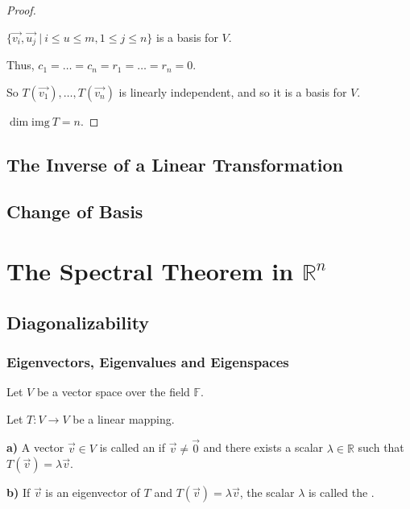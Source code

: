 \documentclass[11pt,fleqn]{book} %
\begin{document}
\begin{proof}
    {~~~}

    $\{\overrightarrow{v_i}, \overrightarrow{u_j} ~|~  i \le u \le m, 1 \le j \le n \}$ is a basis for $V$. 
    
    Thus, $c_1 = \dots = c_n = r_1 = \dots = r_n = 0$. 
    
    So $T(\overrightarrow{v_1}), \dots, T(\overrightarrow{v_n})$ is linearly independent, and so it is a basis for $V$. 
    
    $\dim \mathrm{img}~T = n$. 
\end{proof}

\section{The Inverse of a Linear Transformation}

\section{Change of Basis}

\chapter{The Spectral Theorem in $\mathbb{R}^n$}

\section{Diagonalizability}

\subsection{Eigenvectors, Eigenvalues and Eigenspaces}

\setcounter{chapter}{4}
\setcounter{definitionT}{1}
\begin{definition}

    Let $V$ be a vector space over the field $\mathbb{F}$.

    Let $T: V \to V$ be a linear mapping.

    \textbf{a)} A vector $\overrightarrow{v} \in V$ is called an  if $\overrightarrow{v} \neq \overrightarrow{0}$ and there exists a scalar $\lambda \in \mathbb{R}$ such that $T(\overrightarrow{v}) = \lambda \overrightarrow{v}$.

    \textbf{b)} If $\overrightarrow{v}$ is an eigenvector of $T$ and $T(\overrightarrow{v}) = \lambda\overrightarrow{v}$, the scalar $\lambda$ is called the .
\end{definition}
\end{document}
